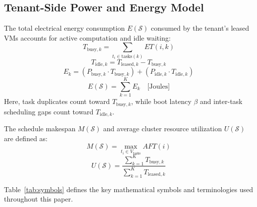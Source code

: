 \documentclass[journal]{IEEEtran}
\begin{document}
\subsection{Tenant-Side Power and Energy Model}
The total electrical energy consumption $E(\mathcal{S})$ consumed by the tenant's leased VMs accounts for active computation and idle waiting:
\begin{equation}
T_{\text{busy},k} = \sum_{t_i \in \text{tasks}(k)} ET(i, k)
\label{eq:tbusy}
\end{equation}
\begin{equation}
T_{\text{idle},k} = T_{\text{leased},k} - T_{\text{busy},k}
\label{eq:tidle}
\end{equation}
\begin{equation}
E_k = \left( P_{\text{busy},k} \cdot T_{\text{busy},k} \right) + \left( P_{\text{idle},k} \cdot T_{\text{idle},k} \right)
\label{eq:ek}
\end{equation}
\begin{equation}
E(\mathcal{S}) = \sum_{k=1}^{K} E_k \quad \text{[Joules]}
\label{eq:energy}
\end{equation}
Here, task duplicates count toward $T_{\text{busy},k}$, while boot latency $\beta$ and inter-task scheduling gaps count toward $T_{\text{idle},k}$.

The schedule makespan $M(\mathcal{S})$ and average cluster resource utilization $U(\mathcal{S})$ are defined as:
\begin{equation}
M(\mathcal{S}) = \max_{t_i \in V_{\text{tasks}}} AFT(i)
\label{eq:makespan}
\end{equation}
\begin{equation}
U(\mathcal{S}) = \frac{\sum_{k=1}^{K} T_{\text{busy},k}}{\sum_{k=1}^{K} T_{\text{leased},k}}
\label{eq:utilization}
\end{equation}

Table~\ref{tab:symbols} defines the key mathematical symbols and terminologies used throughout this paper.
\end{document}
